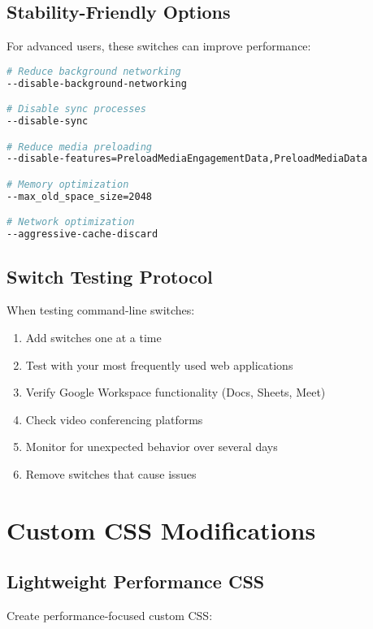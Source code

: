 \documentclass[11pt,a4paper,oneside]{book}
\begin{document}
\subsection{Stability-Friendly Options}

For advanced users, these switches can improve performance:

\begin{codebox}
\begin{lstlisting}[language=bash]
# Reduce background networking
--disable-background-networking

# Disable sync processes
--disable-sync

# Reduce media preloading
--disable-features=PreloadMediaEngagementData,PreloadMediaData

# Memory optimization
--max_old_space_size=2048

# Network optimization
--aggressive-cache-discard
\end{lstlisting}
\end{codebox}

\subsection{Switch Testing Protocol}

When testing command-line switches:

\begin{enumerate}
    \item Add switches one at a time
    \item Test with your most frequently used web applications
    \item Verify Google Workspace functionality (Docs, Sheets, Meet)
    \item Check video conferencing platforms
    \item Monitor for unexpected behavior over several days
    \item Remove switches that cause issues
\end{enumerate}

\section{Custom CSS Modifications}

\subsection{Lightweight Performance CSS}

Create performance-focused custom CSS:
\end{document}
